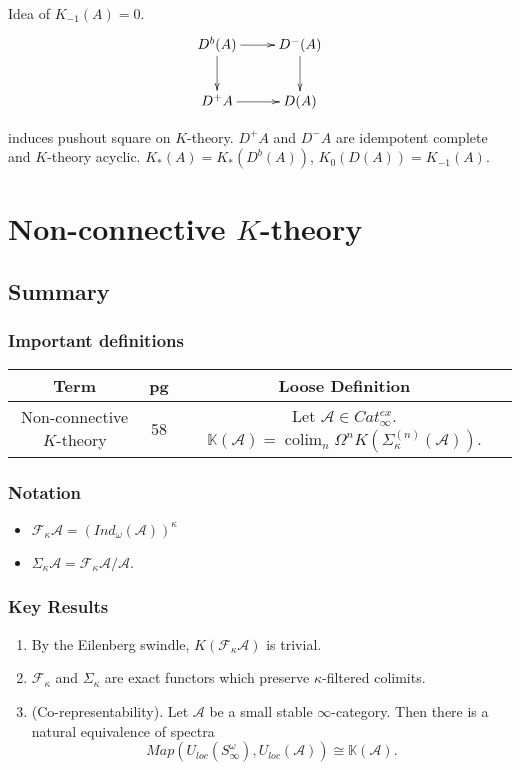 \documentclass[letterpaper]{article}
\theoremstyle{definition}
\newcommand{\mbb}{\mathbb}
\newcommand{\mc}{\mathcal}
\DeclareMathOperator*{\colim}{colim}
\begin{document}
Idea of $K_{-1}(A) = 0$. 
\[
\xymatrix{D^b(A) \ar[r]\ar[d] & D^{-}(A) \ar[d] \\ D^+A \ar[r] & D(A)}
\]

induces pushout square on $K$-theory. $D^+A$ and $D^{-}A$ are
idempotent complete and $K$-theory acyclic. $K_*(A) = K_*(D^b(A))$,
$K_0(D(A)) = K_{-1}(A)$. 

\section{Non-connective $K$-theory}
\subsection{Summary}
\subsubsection{Important definitions}
\begin{tabulary}{0.9\textwidth}{|C|C|C|}
\hline
Term & pg & Loose Definition\\
\hline
\hline
Non-connective $K$-theory & 58  & Let $\mc A \in
                                  Cat^{ex}_\infty$. $\mbb K(\mc A) =
                                  \colim_n \Omega^n
                                  K(\Sigma_\kappa^{(n)}(\mc A))$. \\
\hline
\end{tabulary}
\subsubsection{Notation}
\begin{itemize}
\item $\mc F_\kappa \mc A = (Ind_\omega(\mc A))^\kappa$
\item $\Sigma_\kappa\mc A = \mc F_{\kappa} \mc A/\mc A$.
\end{itemize}
\subsubsection{Key Results}
\begin{enumerate}
\item By the Eilenberg swindle, $K(\mc F_\kappa\mc A)$ is trivial. 
\item $\mc F_\kappa$ and $\Sigma_\kappa$ are exact functors which
  preserve $\kappa$-filtered colimits.
\item (Co-representability). Let $\mc A$ be a small stable $\infty$-category. Then there is a
  natural equivalence of spectra 
\[
Map(U_{loc}(S^\omega_\infty),U_{loc}(\mc A)) \cong \mbb K(\mc A).
\]
\end{enumerate}
\end{document}
